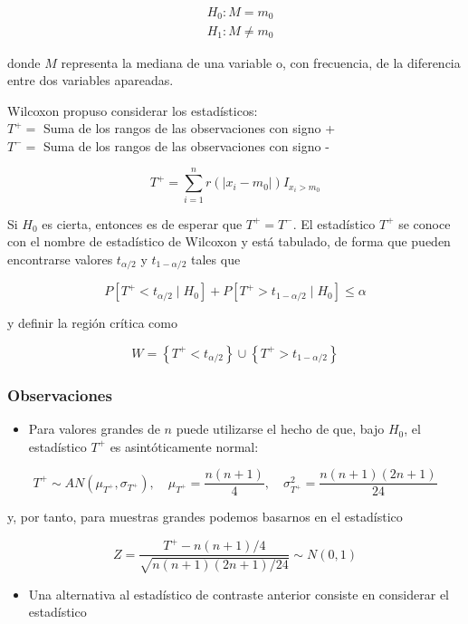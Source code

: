 \documentclass[
]{article}
\providecommand{\tightlist}{%
  \setlength{\itemsep}{0pt}\setlength{\parskip}{0pt}}
\begin{document}
\[
\begin{aligned}
& H_{0}: M=m_{0} \\
& H_{1}: M \neq m_{0}
\end{aligned}
\]

donde \(M\) representa la mediana de una variable o, con frecuencia, de la diferencia entre dos variables apareadas.

Wilcoxon propuso considerar los estadísticos:\\
\(T^{+}=\) Suma de los rangos de las observaciones con signo +\\
\(T^{-}=\) Suma de los rangos de las observaciones con signo -

\[
T^{+}=\sum_{i=1}^{n} r\left(\left|x_{i}-m_{0}\right|\right) I_{x_{i}>m_{0}}
\]

Si \(H_{0}\) es cierta, entonces es de esperar que \(T^{+}=T^{-}\).
El estadístico \(T^{+}\) se conoce con el nombre de estadístico de Wilcoxon y está tabulado, de forma que pueden encontrarse valores \(t_{\alpha / 2}\) y \(t_{1-\alpha / 2}\) tales que

\[
P\left[T^{+}<t_{\alpha / 2} \mid H_{0}\right]+P\left[T^{+}>t_{1-\alpha / 2} \mid H_{0}\right] \leq \alpha
\]

y definir la región crítica como

\[
W=\left\{T^{+}<t_{\alpha / 2}\right\} \cup\left\{T^{+}>t_{1-\alpha / 2}\right\}
\]

\subsubsection{Observaciones}\label{observaciones-3}

\begin{itemize}
\tightlist
\item
  Para valores grandes de \(n\) puede utilizarse el hecho de que, bajo \(H_{0}\), el estadístico \(T^{+}\) es asintóticamente normal:
\end{itemize}

\[
T^{+} \sim A N\left(\mu_{T^{+}}, \sigma_{T^{+}}\right), \quad \mu_{T^{+}}=\frac{n(n+1)}{4}, \quad \sigma_{T^{+}}^{2}=\frac{n(n+1)(2 n+1)}{24}
\]

y, por tanto, para muestras grandes podemos basarnos en el estadístico

\[
Z=\frac{T^{+}-n(n+1) / 4}{\sqrt{n(n+1)(2 n+1) / 24}} \sim N(0,1)
\]

\begin{itemize}
\tightlist
\item
  Una alternativa al estadístico de contraste anterior consiste en considerar el estadístico
\end{itemize}
\end{document}
